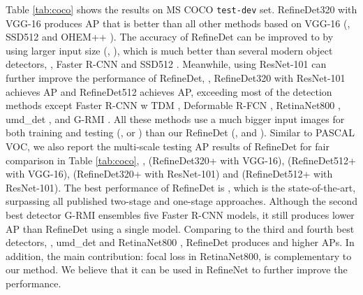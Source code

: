 \documentclass[10pt,twocolumn,letterpaper]{article}
\begin{document}
Table \ref{tab:coco} shows the results on MS COCO {\tt test-dev} set. RefineDet320 with VGG-16 produces  AP that is better than all other methods based on VGG-16 (\eg, SSD512 \cite{DBLP:conf/eccv/LiuAESRFB16} and OHEM++ \cite{DBLP:conf/cvpr/ShrivastavaGG16}). The accuracy of RefineDet can be improved to  by using larger input size (\ie, ), which is much better than several modern object detectors, \eg, Faster R-CNN \cite{DBLP:journals/pami/RenHG017} and SSD512 \cite{DBLP:conf/eccv/LiuAESRFB16}. Meanwhile, using ResNet-101 can further improve the performance of RefineDet, \ie, RefineDet320 with ResNet-101 achieves  AP and RefineDet512 achieves  AP, exceeding most of the detection methods except Faster R-CNN w TDM \cite{DBLP:journals/corr/ShrivastavaSMG16}, Deformable R-FCN \cite{DBLP:conf/iccv/DaiQXLZHW17}, RetinaNet800 \cite{DBLP:conf/iccv/LinPRK17}, umd\_det \cite{DBLP:conf/iccv/BodlaSCD17}, and G-RMI \cite{DBLP:conf/cvpr/HuangRSZKFFWSG016}. All these methods use a much bigger input images for both training and testing (\ie,  or ) than our RefineDet (\ie,  and ). Similar to PASCAL VOC, we also report the multi-scale testing AP results of RefineDet for fair comparison in Table \ref{tab:coco}, \ie,  (RefineDet320+ with VGG-16),  (RefineDet512+ with VGG-16),  (RefineDet320+ with ResNet-101) and  (RefineDet512+ with ResNet-101). The best performance of RefineDet is , which is the state-of-the-art, surpassing all published two-stage and one-stage approaches. Although the second best detector G-RMI \cite{DBLP:conf/cvpr/HuangRSZKFFWSG016} ensembles five Faster R-CNN models, it still produces  lower AP than RefineDet using a single model. Comparing to the third and fourth best detectors, \ie, umd\_det \cite{DBLP:conf/iccv/BodlaSCD17} and RetinaNet800 \cite{DBLP:conf/iccv/LinPRK17}, RefineDet produces  and  higher APs. In addition, the main contribution: focal loss in RetinaNet800, is complementary to our method. We believe that it can be used in RefineNet to further improve the performance.
\end{document}
